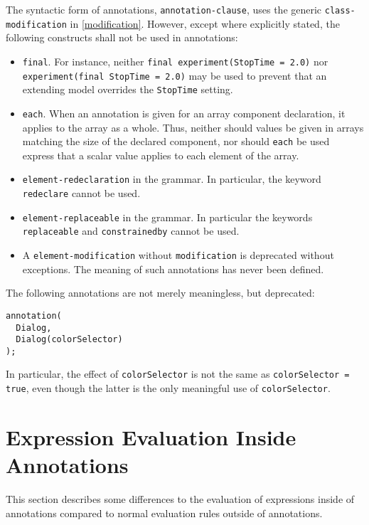 The syntactic form of annotations, \lstinline[language=grammar]!annotation-clause!, uses the generic \lstinline[language=grammar]!class-modification! in \cref{modification}.
However, except where explicitly stated, the following constructs shall not be used in annotations:
\begin{itemize}
\item
\lstinline!final!.
For instance, neither \lstinline!final experiment(StopTime = 2.0)! nor \lstinline!experiment(final StopTime = 2.0)! may be used to prevent that an extending model overrides the \lstinline!StopTime! setting.
\item
\lstinline!each!.
When an annotation is given for an array component declaration, it applies to the array as a whole.
Thus, neither should values be given in arrays matching the size of the declared component, nor should \lstinline!each! be used express that a scalar value applies to each element of the array.
\item
\lstinline[language=grammar]!element-redeclaration! in the grammar.
In particular, the keyword \lstinline!redeclare! cannot be used.
\item
\lstinline[language=grammar]!element-replaceable! in the grammar.
In particular the keywords \lstinline!replaceable! and \lstinline!constrainedby! cannot be used.
\item
A \lstinline[language=grammar]!element-modification! without \lstinline[language=grammar]!modification! is deprecated without exceptions.
The meaning of such annotations has never been defined.
\end{itemize}

\begin{example}
The following annotations are not merely meaningless, but deprecated:
\begin{lstlisting}[language=modelica]
annotation(
  Dialog,
  Dialog(colorSelector)
);
\end{lstlisting}
In particular, the effect of \lstinline!colorSelector! is not the same as \lstinline!colorSelector = true!, even though the latter is the only meaningful use of \lstinline!colorSelector!.
\end{example}


\section{Expression Evaluation Inside Annotations}\label{expression-evaluation-inside-annotations}

This section describes some differences to the evaluation of expressions inside of annotations compared to normal evaluation rules outside of annotations.


